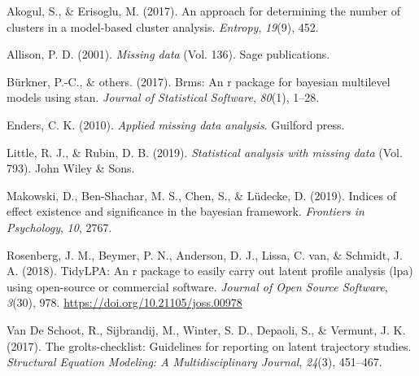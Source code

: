 \documentclass[english,man]{apa6}
\begin{document}
\newpage

\begingroup
\setlength{\parindent}{-0.5in}
\setlength{\leftskip}{0.5in}

\hypertarget{refs}{}
\leavevmode\hypertarget{ref-akogul2017approach}{}%
Akogul, S., \& Erisoglu, M. (2017). An approach for determining the number of clusters in a model-based cluster analysis. \emph{Entropy}, \emph{19}(9), 452.

\leavevmode\hypertarget{ref-allison2001missing}{}%
Allison, P. D. (2001). \emph{Missing data} (Vol. 136). Sage publications.

\leavevmode\hypertarget{ref-burkner2017}{}%
Bürkner, P.-C., \& others. (2017). Brms: An r package for bayesian multilevel models using stan. \emph{Journal of Statistical Software}, \emph{80}(1), 1--28.

\leavevmode\hypertarget{ref-enders2010applied}{}%
Enders, C. K. (2010). \emph{Applied missing data analysis}. Guilford press.

\leavevmode\hypertarget{ref-little2019statistical}{}%
Little, R. J., \& Rubin, D. B. (2019). \emph{Statistical analysis with missing data} (Vol. 793). John Wiley \& Sons.

\leavevmode\hypertarget{ref-makowski2019}{}%
Makowski, D., Ben-Shachar, M. S., Chen, S., \& Lüdecke, D. (2019). Indices of effect existence and significance in the bayesian framework. \emph{Frontiers in Psychology}, \emph{10}, 2767.

\leavevmode\hypertarget{ref-R-tidyLPA}{}%
Rosenberg, J. M., Beymer, P. N., Anderson, D. J., Lissa, C. van, \& Schmidt, J. A. (2018). TidyLPA: An r package to easily carry out latent profile analysis (lpa) using open-source or commercial software. \emph{Journal of Open Source Software}, \emph{3}(30), 978. \url{https://doi.org/10.21105/joss.00978}

\leavevmode\hypertarget{ref-van2017grolts}{}%
Van De Schoot, R., Sijbrandij, M., Winter, S. D., Depaoli, S., \& Vermunt, J. K. (2017). The grolts-checklist: Guidelines for reporting on latent trajectory studies. \emph{Structural Equation Modeling: A Multidisciplinary Journal}, \emph{24}(3), 451--467.

\endgroup
\end{document}

